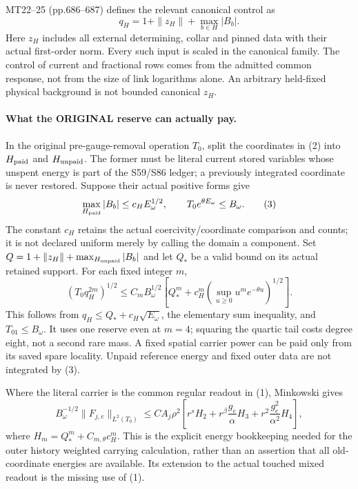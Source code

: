 \documentclass[11pt]{article}
\begin{document}
MT22--25 (pp.686--687) defines the relevant canonical control as
\[
 q_H=1+\|z_H\|+\max_{b\in H}|B_b|.                    \tag{2}
\]
Here $z_H$ includes all external determining, collar and pinned data with their
actual first-order norm. Every such input is scaled in the canonical family.
The control of current and fractional rows comes from the admitted common
response, not from the size of link logarithms alone. An arbitrary held-fixed
physical background is not bounded canonical $z_H$.

\paragraph{What the ORIGINAL reserve can actually pay.}
In the original pre-gauge-removal operation $T_0$, split the coordinates in (2)
into $H_{\rm paid}$ and $H_{\rm unpaid}$. The former must be literal current stored
variables whose unspent energy is part of the S59/S86 ledger; a previously
integrated coordinate is never restored. Suppose their actual positive forms give
\[
 \max_{H_{\rm paid}}|B_b|\le c_H E_\omega^{1/2},\qquad
 T_0 e^{\theta E_\omega}\le B_\omega.                 \tag{3}
\]
The constant $c_H$ retains the actual coercivity/coordinate comparison and counts;
it is not declared uniform merely by calling the domain a component. Set
$Q=1+\|z_H\|+\max_{H_{\rm unpaid}}|B_b|$ and let $Q_*$ be a valid bound on its
actual retained support. For each fixed integer $m$,
\[
 (T_0 q_H^{2m})^{1/2}
 \le C_m B_\omega^{1/2}
 \left[Q_*^m+c_H^m\left(\sup_{u\ge0}u^m e^{-\theta u}\right)^{1/2}\right].
                                                               \tag{4}
\]
This follows from $q_H\le Q_*+c_H\sqrt{E_\omega}$, the elementary sum inequality,
and $T_01\le B_\omega$. It uses one reserve even at $m=4$; squaring the quartic
tail costs degree eight, not a second rare mass. A fixed spatial carrier power
can be paid only from its saved spare locality. Unpaid reference energy and fixed
outer data are not integrated by (3).

Where the literal carrier is the common regular readout in (1), Minkowski gives
\[
 B_\omega^{-1/2}\|F_{j,e}\|_{L^2(T_0)}
 \le C A_j\rho^2\left[r^s H_2+
 r^\beta\frac{g_e}{\alpha}H_3+
 r^2\frac{g_e^2}{\alpha^2}H_4\right],                 \tag{5}
\]
where $H_m=Q_*^m+C_{m,\theta}c_H^m$.
This is the explicit energy bookkeeping needed for the outer history weighted carrying calculation, rather than an
assertion that all old-coordinate energies are available. Its extension to the
actual touched mixed readout is the missing use of (1).
\end{document}
